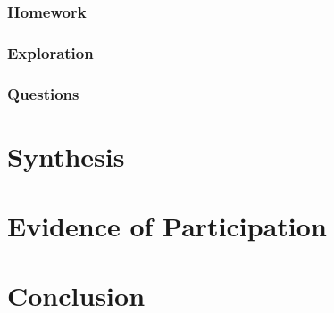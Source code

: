 \documentclass{article}
\theoremstyle{theorem}
\theoremstyle{definition}
\theoremstyle{remark}
\begin{document}
\subsubsection{Homework}
\subsubsection{Exploration}
\subsubsection{Questions}

\section{Synthesis}

\section{Evidence of Participation}

\section{Conclusion}\label{conclusion}

\begin{thebibliography}{9}
\end{thebibliography}
\end{document}
